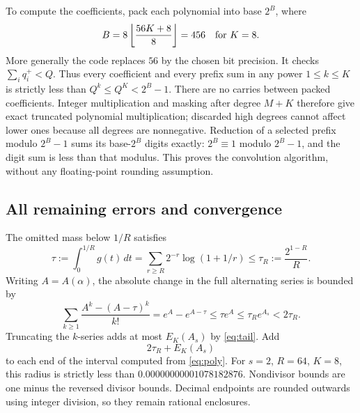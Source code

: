 \documentclass[10pt]{article}
\theoremstyle{remark}
\begin{document}
To compute the coefficients, pack each polynomial into base $2^B$,
where
\[
 B=8\left\lfloor\frac{56K+8}{8}\right\rfloor=456
 \quad\hbox{for }K=8.
\]
More generally the code replaces $56$ by the chosen bit precision.
It checks $\sum_iq_i^+<Q$. Thus every coefficient and every prefix
sum in any power $1\leq k\leq K$ is strictly less than
$Q^k\leq Q^K<2^B-1$. There are no carries between packed coefficients.
Integer multiplication and masking after degree $M+K$ therefore give
exact truncated polynomial multiplication; discarded high degrees
cannot affect lower ones because all degrees are nonnegative.
Reduction of a selected prefix modulo $2^B-1$ sums its base-$2^B$
digits exactly: $2^B\equiv1$ modulo $2^B-1$, and the digit sum is
less than that modulus. This proves the convolution algorithm, without
any floating-point rounding assumption.

\subsection{All remaining errors and convergence}\label{subsec:errors}
The omitted mass below $1/R$ satisfies
\[
 \tau:=\int_0^{1/R}g(t)\,dt
 =\sum_{r\geq R}2^{-r}\log(1+1/r)
 \leq\tau_R:=\frac{2^{1-R}}R.
\]
Writing $A=A(\alpha)$, the absolute change in the full alternating
series is bounded by
\[
 \sum_{k\geq1}\frac{A^k-(A-\tau)^k}{k!}
 =e^A-e^{A-\tau}\leq\tau e^A\leq\tau_R e^{A_s}<2\tau_R.
\]
Truncating the $k$-series adds at most $E_K(A_s)$ by
\eqref{eq:tail}. Add
\begin{equation}\label{eq:radius}
 2\tau_R+E_K(A_s)
\end{equation}
to each end of the interval computed from \eqref{eq:poly}. For $s=2$,
$R=64$, $K=8$, this radius is strictly less than
$0.00000000001078182876$. Nondivisor bounds are one minus the reversed
divisor bounds. Decimal endpoints are rounded outwards using integer
division, so they remain rational enclosures.
\end{document}

